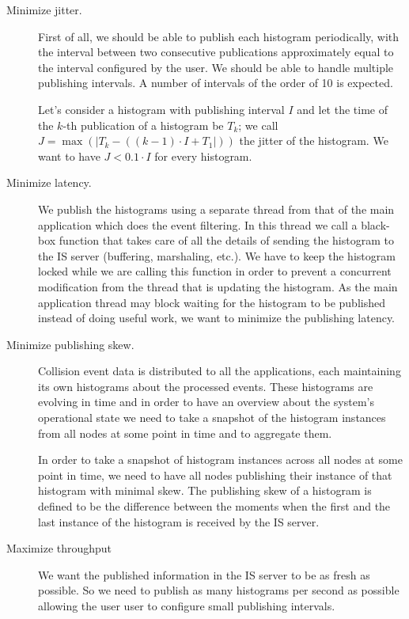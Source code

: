 \begin{description}
\item[Minimize jitter.]

First of all, we should be able to publish each histogram periodically, with the interval between two consecutive publications approximately equal to the interval configured by the user. We should be able to handle multiple publishing intervals. A number of intervals of the order of 10 is expected.

Let's consider a histogram with publishing interval $I$ and let the time of the $k$-th publication of a histogram be $T_k$; we call $J=\max(\lvert T_k-((k-1) \cdot I+T_1\rvert))$ the jitter of the histogram. We want to have $J < 0.1\cdot I$ for every histogram.

\item[Minimize latency.]

We publish the histograms using a separate thread from that of the main application which does the event filtering. In this thread we call a black-box function that takes care of all the details of sending the histogram to the IS server (buffering, marshaling, etc.). We have to keep the histogram locked while we are calling this function in order to prevent a concurrent modification from the thread that is updating the histogram. As the main application thread may block waiting for the histogram to be published instead of doing useful work, we want to minimize the publishing latency.

\item [Minimize publishing skew.]

Collision event data is distributed to all the applications, each maintaining its own histograms about the processed events. These histograms are evolving in time and in order to have an overview about the system’s operational state we need to take a snapshot of the histogram instances from all nodes at some point in time and to aggregate them.

In order to take a snapshot of histogram instances across all nodes at some point in time, we need to have all nodes publishing their instance of that histogram with minimal skew. The publishing skew of a histogram is defined to be the difference between the moments when the first and the last instance of the histogram is received by the IS server.  

\item [Maximize throughput]

We want the published information in the IS server to be as fresh as possible. So we need to publish as many histograms per second as possible allowing the user user to configure small publishing intervals.


\end{description}
